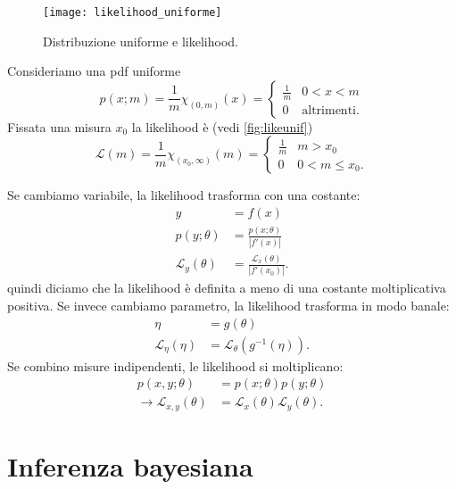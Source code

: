 \begin{example}
	\begin{figure}
		\centering
		\texttt{[image: likelihood\_uniforme]}
		\caption{\label{fig:likeunif}%
		Distribuzione uniforme e likelihood.}
	\end{figure}
	Consideriamo una pdf uniforme
	\begin{equation*}
		p(x;m)
		= \frac1m \chi_{(0,m)}(x)
		= \begin{cases}
			\frac 1m & 0<x<m \\
			0 & \text{altrimenti.}
		\end{cases}
	\end{equation*}
	Fissata una misura $x_0$ la likelihood è (vedi \autoref{fig:likeunif})
	\begin{equation*}
		\mathcal L(m)
		= \frac1m \chi_{(x_0,\infty)}(m)
		= \begin{cases}
			\frac 1m & m > x_0 \\
			0 & 0 < m \le x_0.
		\end{cases}
	\end{equation*}
\end{example}

Se cambiamo variabile, la likelihood trasforma con una costante:
\begin{align*}
	y &= f(x) \\
	p(y;\theta) &= \frac{p(x;\theta)}{|f'(x)|} \\
	\mathcal L_y(\theta) &= \frac{\mathcal L_x(\theta)}{|f'(x_0)|}.
\end{align*}
quindi diciamo che la likelihood è definita a meno di una costante moltiplicativa positiva.
Se invece cambiamo parametro, la likelihood trasforma in modo banale:
\begin{align*}
	\eta &= g(\theta) \\
	\mathcal L_\eta(\eta) &= \mathcal L_\theta(g^{-1}(\eta)).
\end{align*}
Se combino misure indipendenti, le likelihood si moltiplicano:
\begin{align*}
	p(x,y;\theta) &= p(x;\theta) p(y;\theta) \\
	\rightarrow \mathcal L_{x,y}(\theta) &= \mathcal L_x(\theta) \mathcal L_y(\theta).
\end{align*}

\section{Inferenza bayesiana}

